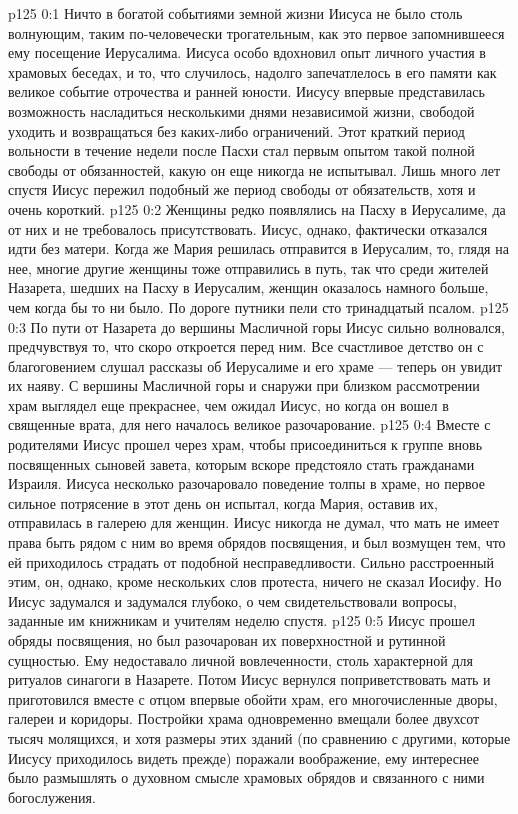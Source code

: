 \author{Комиссия срединников}
\vs p125 0:1 Ничто в богатой событиями земной жизни Иисуса не было столь волнующим, таким по\hyp{}человечески трогательным, как это первое запомнившееся ему посещение Иерусалима. Иисуса особо вдохновил опыт личного участия в храмовых беседах, и то, что случилось, надолго запечатлелось в его памяти как великое событие отрочества и ранней юности. Иисусу впервые представилась возможность насладиться несколькими днями независимой жизни, свободой уходить и возвращаться без каких\hyp{}либо ограничений. Этот краткий период вольности в течение недели после Пасхи стал первым опытом такой полной свободы от обязанностей, какую он еще никогда не испытывал. Лишь много лет спустя Иисус пережил подобный же период свободы от обязательств, хотя и очень короткий.
\vs p125 0:2 \pc Женщины редко появлялись на Пасху в Иерусалиме, да от них и не требовалось присутствовать. Иисус, однако, фактически отказался идти без матери. Когда же Мария решилась отправится в Иерусалим, то, глядя на нее, многие другие женщины тоже отправились в путь, так что среди жителей Назарета, шедших на Пасху в Иерусалим, женщин оказалось намного больше, чем когда бы то ни было. По дороге путники пели сто тринадцатый псалом.
\vs p125 0:3 По пути от Назарета до вершины Масличной горы Иисус сильно волновался, предчувствуя то, что скоро откроется перед ним. Все счастливое детство он с благоговением слушал рассказы об Иерусалиме и его храме --- теперь он увидит их наяву. С вершины Масличной горы и снаружи при близком рассмотрении храм выглядел еще прекраснее, чем ожидал Иисус, но когда он вошел в священные врата, для него началось великое разочарование.
\vs p125 0:4 Вместе с родителями Иисус прошел через храм, чтобы присоединиться к группе вновь посвященных сыновей завета, которым вскоре предстояло стать гражданами Израиля. Иисуса несколько разочаровало поведение толпы в храме, но первое сильное потрясение в этот день он испытал, когда Мария, оставив их, отправилась в галерею для женщин. Иисус никогда не думал, что мать не имеет права быть рядом с ним во время обрядов посвящения, и был возмущен тем, что ей приходилось страдать от подобной несправедливости. Сильно расстроенный этим, он, однако, кроме нескольких слов протеста, ничего не сказал Иосифу. Но Иисус задумался и задумался глубоко, о чем свидетельствовали вопросы, заданные им книжникам и учителям неделю спустя.
\vs p125 0:5 Иисус прошел обряды посвящения, но был разочарован их поверхностной и рутинной сущностью. Ему недоставало личной вовлеченности, столь характерной для ритуалов синагоги в Назарете. Потом Иисус вернулся поприветствовать мать и приготовился вместе с отцом впервые обойти храм, его многочисленные дворы, галереи и коридоры. Постройки храма одновременно вмещали более двухсот тысяч молящихся, и хотя размеры этих зданий (по сравнению с другими, которые Иисусу приходилось видеть прежде) поражали воображение, ему интереснее было размышлять о духовном смысле храмовых обрядов и связанного с ними богослужения.
